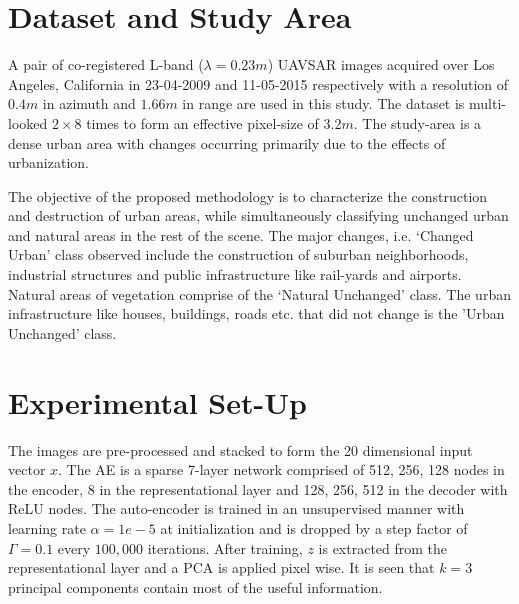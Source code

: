 

\section{Dataset and Study Area}

A pair of co-registered L-band ($\lambda = 0.23m$) UAVSAR images acquired over Los Angeles, California in 23-04-2009 and 11-05-2015 respectively  with a resolution of $0.4m$ in azimuth and $1.66m$ in range are used in this study. The dataset is multi-looked $2\times8$ times to form an effective pixel-size of $3.2m$.  The study-area is a dense urban area with changes occurring primarily due to the effects of urbanization. 

The objective of the proposed methodology is to  characterize the construction and destruction of urban areas, while simultaneously classifying unchanged urban and natural areas in the rest of the scene.
The major changes, i.e. `Changed Urban' class observed include the construction of suburban neighborhoods, industrial structures and public infrastructure like rail-yards and airports.  Natural areas of vegetation  comprise of the `Natural Unchanged' class. The urban infrastructure like houses, buildings, roads etc. that did not change is the 'Urban Unchanged' class.

\section{Experimental Set-Up}
\label{sec:exp}
The images are pre-processed and stacked to form the 20 dimensional input vector $x$.  The AE is a sparse 7-layer network comprised of 512, 256, 128 nodes in the encoder, 8 in the representational layer and 128, 256, 512 in the decoder with ReLU nodes. The auto-encoder is trained in an unsupervised manner with learning rate $\alpha=1e-5$ at initialization and is dropped by a step factor of $\Gamma=0.1$ every $100,000$ iterations.  After training,  $z$ is extracted from the representational layer and a PCA is applied pixel wise. It is seen that $k=3$ principal components contain most of the useful information.


